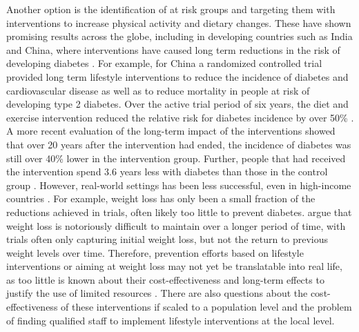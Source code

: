 Another option is the identification of at risk groups and targeting them with interventions to increase physical activity and dietary changes. These have shown promising results across the globe, including in developing countries such as India and China, where interventions have caused long term reductions in the risk of developing diabetes \parencite{Cefalu2016}. For example, for China a randomized controlled trial provided long term lifestyle interventions to reduce the incidence of diabetes and cardiovascular disease as well as to reduce mortality in people at risk of developing type 2 diabetes. Over the active trial period of six years, the diet and exercise intervention reduced the relative risk for diabetes incidence by  over 50\% \parencite{Pan1997}. A more recent evaluation of the long-term impact of the interventions showed that over 20 years after the intervention had ended, the incidence of diabetes was still over 40\% lower in the intervention group. Further, people that had received the intervention spend 3.6 years less with diabetes than those in the control group \parencite{Li2008}. However, \DIFdelbegin {}\DIFdelend \DIFaddbegin {}\DIFaddend real-world settings \DIFdelbegin {}\DIFdelend has been less successful, even in high-income countries \parencite{Wareham2016, Kahn2014}. For example, weight loss has only been a small fraction of the reductions achieved in trials, often likely too little to prevent diabetes. \textcite{Kahn2014} argue that weight loss is notoriously difficult to maintain over a longer period of time, with trials often only capturing initial weight loss, but not the return to previous weight levels over time.  Therefore, prevention efforts based on lifestyle interventions or aiming at weight loss may not yet be translatable into real life, as too little is known about their cost-effectiveness and long-term effects to justify the use of limited resources \parencite{Kahn2014}. There are also questions about the cost-effectiveness of these interventions if scaled to a population level and the problem of finding qualified staff to implement lifestyle interventions at the local level. 

